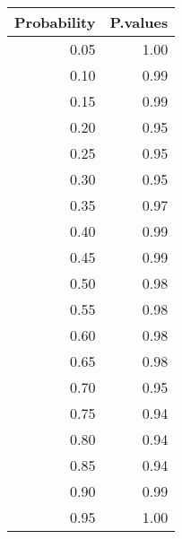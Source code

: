 \begin{table}[ht]
\centering
\begin{tabular}{rr}
  \hline
Probability & P.values \\ 
  \hline
0.05 & 1.00 \\ 
  0.10 & 0.99 \\ 
  0.15 & 0.99 \\ 
  0.20 & 0.95 \\ 
  0.25 & 0.95 \\ 
  0.30 & 0.95 \\ 
  0.35 & 0.97 \\ 
  0.40 & 0.99 \\ 
  0.45 & 0.99 \\ 
  0.50 & 0.98 \\ 
  0.55 & 0.98 \\ 
  0.60 & 0.98 \\ 
  0.65 & 0.98 \\ 
  0.70 & 0.95 \\ 
  0.75 & 0.94 \\ 
  0.80 & 0.94 \\ 
  0.85 & 0.94 \\ 
  0.90 & 0.99 \\ 
  0.95 & 1.00 \\ 
   \hline
\end{tabular}
\end{table}
